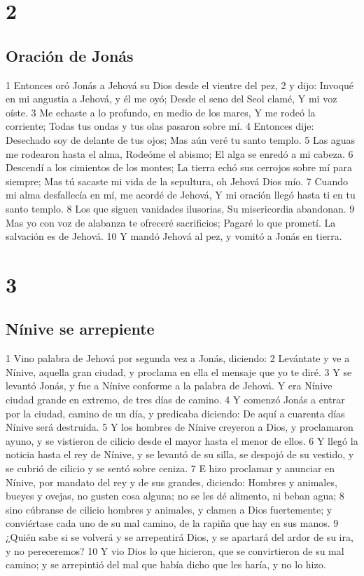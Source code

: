 \chapter{2}

\section*{Oración de Jonás}

1 Entonces oró Jonás a Jehová su Dios desde el vientre del pez,
2 y dijo:
Invoqué en mi angustia a Jehová, y él me oyó;
Desde el seno del Seol clamé,
Y mi voz oíste.
3 Me echaste a lo profundo, en medio de los mares,
Y me rodeó la corriente;
Todas tus ondas y tus olas pasaron sobre mí.
4 Entonces dije: Desechado soy de delante de tus ojos;
Mas aún veré tu santo templo.
5 Las aguas me rodearon hasta el alma,
Rodeóme el abismo;
El alga se enredó a mi cabeza.
6 Descendí a los cimientos de los montes;
La tierra echó sus cerrojos sobre mí para siempre;
Mas tú sacaste mi vida de la sepultura, oh Jehová Dios mío.
7 Cuando mi alma desfallecía en mí, me acordé de Jehová,
Y mi oración llegó hasta ti en tu santo templo.
8 Los que siguen vanidades ilusorias,
Su misericordia abandonan.
9 Mas yo con voz de alabanza te ofreceré sacrificios;
Pagaré lo que prometí.
La salvación es de Jehová.
10 Y mandó Jehová al pez, y vomitó a Jonás en tierra.

\chapter{3}

\section*{Nínive se arrepiente}

1 Vino palabra de Jehová por segunda vez a Jonás, diciendo:
2 Levántate y ve a Nínive, aquella gran ciudad, y proclama en ella el mensaje que yo te diré.
3 Y se levantó Jonás, y fue a Nínive conforme a la palabra de Jehová. Y era Nínive ciudad grande en extremo, de tres días de camino.
4 Y comenzó Jonás a entrar por la ciudad, camino de un día, y predicaba diciendo: De aquí a cuarenta días Nínive será destruida.
5 Y los hombres de Nínive creyeron a Dios, y proclamaron ayuno, y se vistieron de cilicio desde el mayor hasta el menor de ellos. 
6 Y llegó la noticia hasta el rey de Nínive, y se levantó de su silla, se despojó de su vestido, y se cubrió de cilicio y se sentó sobre ceniza.
7 E hizo proclamar y anunciar en Nínive, por mandato del rey y de sus grandes, diciendo: Hombres y animales, bueyes y ovejas, no gusten cosa alguna; no se les dé alimento, ni beban agua;
8 sino cúbranse de cilicio hombres y animales, y clamen a Dios fuertemente; y conviértase cada uno de su mal camino, de la rapiña que hay en sus manos.
9 ¿Quién sabe si se volverá y se arrepentirá Dios, y se apartará del ardor de su ira, y no pereceremos?
10 Y vio Dios lo que hicieron, que se convirtieron de su mal camino; y se arrepintió del mal que había dicho que les haría, y no lo hizo.


